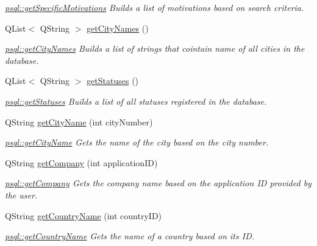\begin{DoxyCompactItemize}
\begin{DoxyCompactList}\small\item\em \mbox{\hyperlink{classpsql_a7c86e4ba33784dece1bf897537087a68}{psql\+::get\+Specific\+Motivations}} Builds a list of motivations based on search criteria. \end{DoxyCompactList}\item 
Q\+List$<$ Q\+String $>$ \mbox{\hyperlink{classpsql_a42ee0cf90055ba6a7a6f564cf04d8bb8}{get\+City\+Names}} ()
\begin{DoxyCompactList}\small\item\em \mbox{\hyperlink{classpsql_a42ee0cf90055ba6a7a6f564cf04d8bb8}{psql\+::get\+City\+Names}} Builds a list of strings that cointain name of all cities in the database. \end{DoxyCompactList}\item 
Q\+List$<$ Q\+String $>$ \mbox{\hyperlink{classpsql_a14854d28aabc7e658aea87a7b8b52e5c}{get\+Statuses}} ()
\begin{DoxyCompactList}\small\item\em \mbox{\hyperlink{classpsql_a14854d28aabc7e658aea87a7b8b52e5c}{psql\+::get\+Statuses}} Builds a list of all statuses registered in the database. \end{DoxyCompactList}\item 
Q\+String \mbox{\hyperlink{classpsql_a7acc18034ef60c8a1e69b0e1a15d8ab2}{get\+City\+Name}} (int city\+Number)
\begin{DoxyCompactList}\small\item\em \mbox{\hyperlink{classpsql_a7acc18034ef60c8a1e69b0e1a15d8ab2}{psql\+::get\+City\+Name}} Gets the name of the city based on the city number. \end{DoxyCompactList}\item 
Q\+String \mbox{\hyperlink{classpsql_a09745cd03f09ffb2dacacaab4281915f}{get\+Company}} (int application\+ID)
\begin{DoxyCompactList}\small\item\em \mbox{\hyperlink{classpsql_a09745cd03f09ffb2dacacaab4281915f}{psql\+::get\+Company}} Gets the company name based on the application ID provided by the user. \end{DoxyCompactList}\item 
Q\+String \mbox{\hyperlink{classpsql_a5724e9992e6a5c98524ab73b98f4202d}{get\+Country\+Name}} (int country\+ID)
\begin{DoxyCompactList}\small\item\em \mbox{\hyperlink{classpsql_a5724e9992e6a5c98524ab73b98f4202d}{psql\+::get\+Country\+Name}} Gets the name of a country based on its ID. \end{DoxyCompactList}\item 

\end{DoxyCompactItemize}
